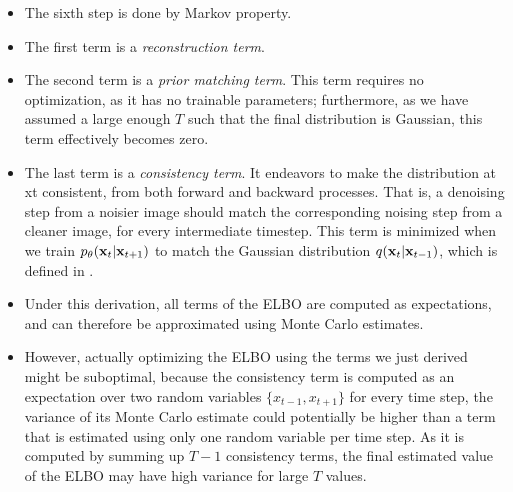 \begin{itemize}
	\item The sixth step is done by Markov property.
	\item The first term is a \textit{reconstruction term}. 
	\item The second term is a \textit{prior matching term}. This term requires no optimization, as it has no trainable parameters; furthermore, as we have assumed a large enough $T$ such that the final distribution is Gaussian, this term effectively becomes zero.
	\item The last term is a \textit{consistency term}. It endeavors to make the distribution at xt consistent, from both forward and backward processes. That is, a denoising step from a noisier image should match the corresponding noising step from a cleaner image, for every intermediate timestep.  This term is minimized when we train $p_\theta({\mathbf{x}}_t|{\mathbf{x}}_{t+1})$ to match the Gaussian distribution $q({\mathbf{x}}_t|{\mathbf{x}}_{t-1})$, which is defined in . %
	\item Under this derivation, all terms of the ELBO are computed as expectations, and can therefore be approximated using Monte Carlo estimates. 
	\item However, actually optimizing the ELBO using the terms we just derived might be suboptimal, because the consistency term is computed as an expectation over two random variables $\{x_{t-1}, x_{t+1}\}$ for every time step, the variance of its Monte Carlo estimate could potentially be higher than a term that is estimated using only one random variable per time step. As it is computed by summing up $T-1$ consistency terms, the final estimated value of the ELBO may have high variance for large $T$ values.
\end{itemize}

